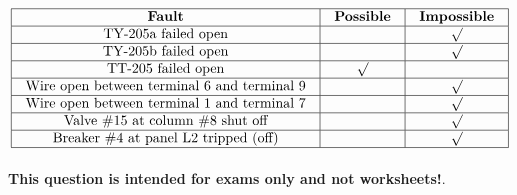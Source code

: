 






$$\vbox{\offinterlineskip
\halign{\strut
\vrule \quad\hfil # \ \hfil & 
\vrule \quad\hfil # \ \hfil & 
\vrule \quad\hfil # \ \hfil \vrule \cr
\noalign{\hrule}
%
{\bf Fault} & {\bf Possible} & {\bf Impossible} \cr
%
\noalign{\hrule}
%
TY-205a failed open &  & $\surd$ \cr
%
\noalign{\hrule}
%
TY-205b failed open &  & $\surd$ \cr
%
\noalign{\hrule}
%
TT-205 failed open & $\surd$ &  \cr
%
\noalign{\hrule}
%
Wire open between terminal 6 and terminal 9 &  & $\surd$ \cr
%
\noalign{\hrule}
%
Wire open between terminal 1 and terminal 7 &  & $\surd$ \cr
%
\noalign{\hrule}
%
Valve \#15 at column \#8 shut off &  & $\surd$ \cr
%
\noalign{\hrule}
%
Breaker \#4 at panel L2 tripped (off) &  & $\surd$ \cr
%
\noalign{\hrule}
} %
}$$ %








{\bf This question is intended for exams only and not worksheets!}.



